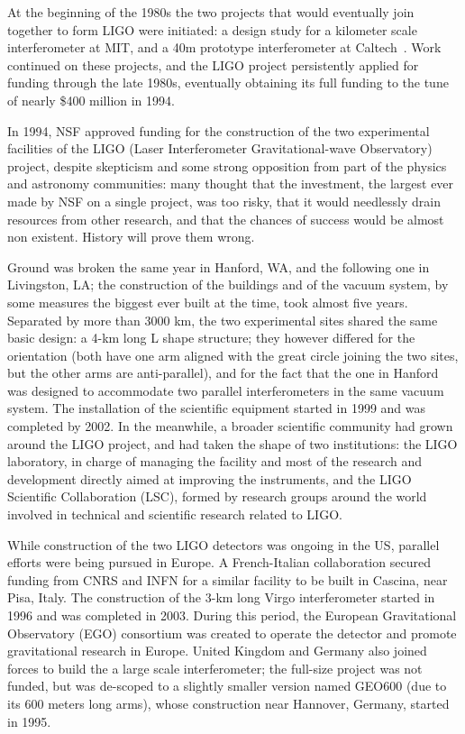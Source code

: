 At the beginning of the 1980s the two projects that would eventually join together to form LIGO were initiated: 
a design study for a kilometer scale interferometer at MIT, and a 40m 
prototype interferometer at Caltech~\cite{caltech40m}. Work continued on these projects, and the LIGO project persistently applied 
for funding through the late 1980s, eventually obtaining its full funding to the tune of nearly \$400 million in 1994. 


In 1994, NSF approved funding for the construction of the two experimental facilities 
of the LIGO (Laser Interferometer Gravitational-wave Observatory) project, despite 
skepticism and some strong opposition from part of the physics and astronomy 
communities: many thought that the investment, the largest ever made by NSF on a 
single project, was too risky, that it would needlessly drain resources from other 
research, and that the chances of success would be almost non existent. History will prove them wrong.

Ground was broken the same year in Hanford, WA, and the following one in Livingston, LA; 
the construction of the buildings and of the vacuum system, by some measures the biggest 
ever built at the time, took almost five years. Separated by more than 3000 km, the two 
experimental sites shared the same basic design: a 4-km long L shape structure; they 
however differed for the orientation (both have one arm aligned with the great circle joining the two sites, but the other arms are anti-parallel), and for the fact that the one in Hanford was 
designed to accommodate two parallel interferometers in the same vacuum system. 
The installation of the scientific equipment started in 1999 and was completed by 2002. 
In the meanwhile, a broader scientific community had grown around the LIGO project, 
and had taken the shape of two institutions: the LIGO laboratory, in charge of managing 
the facility and most of the research and development directly aimed at improving the 
instruments, and the LIGO Scientific Collaboration (LSC), formed by research groups 
around the world involved in technical and scientific research related to LIGO.

While construction of the two LIGO detectors was ongoing in the US, parallel efforts 
were being pursued in Europe. A French-Italian collaboration secured funding from CNRS and INFN for a 
similar facility to be built in Cascina, near Pisa, Italy. The construction of the 3-km 
long Virgo interferometer started in 1996 and was completed in 2003. During this period, 
the European Gravitational Observatory (EGO) consortium was created to operate the detector 
and promote gravitational research in Europe. United Kingdom and Germany also joined 
forces to build the a large scale interferometer; the full-size project was not funded, but 
was de-scoped to a slightly smaller version named GEO600 (due to its 600 meters long arms), 
whose construction near Hannover, Germany, started in 1995.

